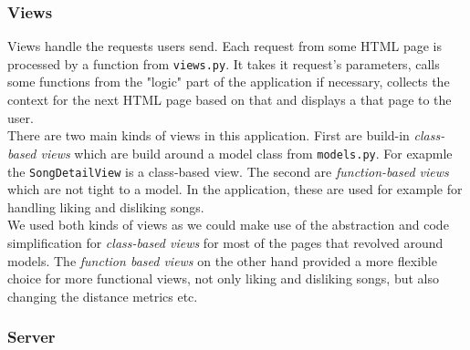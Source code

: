 \subsubsection{Views}
Views handle the requests users send. Each request from some HTML page is processed by a function from \texttt{views.py}. It takes it request's parameters, calls some functions from the "logic" part of the application if necessary, collects the context for the next HTML page based on that and displays a that page to the user. \\
There are two main kinds of views in this application. First are build-in \textit{class-based views} which are build around a model class from \texttt{models.py}. For exapmle the \texttt{SongDetailView} is a class-based view. The second are \textit{function-based views} which are not tight to a model. In the application, these are used for example for handling liking and disliking songs. \\
We used both kinds of views as we could make use of the abstraction and code simplification for \textit{class-based views} for most of the pages that revolved around models. The \textit{function based views} on the other hand provided a more flexible choice for more functional views, not only liking and disliking songs, but also changing the distance metrics etc. \\

\subsubsection{Server}\label{sssec:server}

